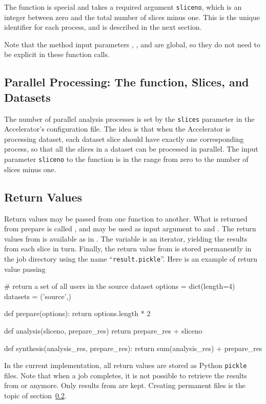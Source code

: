The \analysis function is special and takes a required argument
\texttt{sliceno}, which is an integer between zero and the total
number of slices minus one.  This is the unique identifier for each
\analysis process, and is described in the next section.

Note that the method input parameters \options, \jobids, and \datasets
are global, so they do not need to be explicit in these function
calls.


\subsection{Parallel Processing:  The \analysis function, Slices, and Datasets}
The number of parallel analysis processes is set by the
\texttt{slices} parameter in the Accelerator's configuration file.
The idea is that when the Accelerator is processing dataset, each
dataset slice should have exactly one corresponding \analysis process,
so that all the slices in a dataset can be processed in parallel.  The
input parameter \texttt{sliceno} to the \analysis function is in the
range from zero to the number of slices minus one.


\subsection{Return Values}
Return values may be passed from one function to another.  What is
returned from prepare is called \prepareres, and may be used as input
argument to \analysis and \synthesis.  The return values from
\analysis is available as \analysisres in \synthesis.  The
\analysisres variable is an iterator, yielding the results from each
slice in turn.  Finally, the return value from \synthesis is stored
permanently in the job directory using the name
``\texttt{result.pickle}''.  Here is an example of return value passing
\begin{python}
# return a set of all users in the source dataset
options = dict(length=4)
datasets = ('source',)

def prepare(options):
    return options.length * 2

def analysis(sliceno, prepare_res)
    return prepare_res + sliceno

def synthesis(analysis_res, prepare_res):
     return sum(analysis_res) + prepare_res
\end{python}
In the current implementation, all return values are stored as Python
\texttt{pickle} files.  Note that when a job completes, it is not
possible to retrieve the results from \prepare or \analysis anymore.
Only results from \synthesis are kept.  Creating permanent files is
the topic of section~\ref{}.


